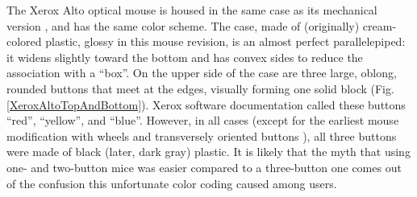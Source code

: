\documentclass[11pt, a4paper]{article}
\begin{document}
The Xerox Alto optical mouse is housed in the same case as its mechanical version \cite{vlsi82}, and has the same color scheme. The case, made of (originally) cream-colored plastic, glossy in this mouse revision, is an almost perfect parallelepiped: it widens slightly toward the bottom and has convex sides to reduce the association with a ``box''. On the upper side of the case are three large, oblong, rounded buttons that meet at the edges, visually forming one solid block (Fig. \ref{XeroxAltoTopAndBottom}). Xerox software documentation called these buttons ``red'', ``yellow'', and ``blue''. However, in all cases (except for the earliest mouse modification with wheels and transversely oriented buttons \cite{vlsi81}), all three buttons were made of black (later, dark gray) plastic. It is likely that the myth that using one- and two-button mice was easier compared to a three-button one comes out of the confusion this unfortunate color coding caused among users.
\end{document}
